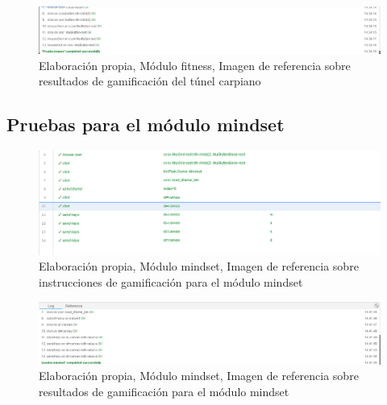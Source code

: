 \begin{figure}[H]
  \centering
  \includegraphics[width=1\linewidth]{Imagenes/Imagen8.png}
  \caption{Elaboración propia, Módulo fitness, Imagen de referencia sobre resultados de gamificación del túnel carpiano}
  \label{fig:Imagen11fitness}
\end{figure}
\subsection{Pruebas para el módulo mindset}
    \begin{figure}[H]
  \centering
  \includegraphics[width=1\linewidth]{Imagenes/Imagen9.png}
  \caption{Elaboración propia, Módulo mindset, Imagen de referencia sobre instrucciones de gamificación para el módulo mindset}
  \label{fig:Imagen2mindset}
\end{figure}

\begin{figure}[H]
  \centering
  \includegraphics[width=1\linewidth]{Imagenes/Imagen10.png}
  \caption{Elaboración propia, Módulo mindset, Imagen de referencia sobre resultados de gamificación para el módulo mindset}
  \label{fig:Imagen3mindset}
\end{figure}
